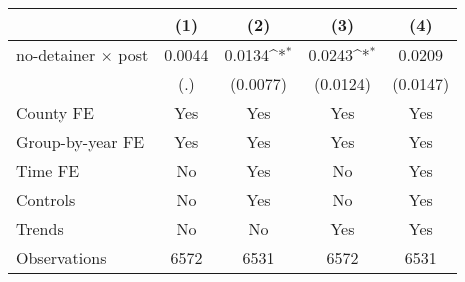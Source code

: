 {
\def\sym#1{\ifmmode^{#1}\else\(^{#1}\)\fi}
\begin{tabular*}{0.7\textwidth}{@{\hskip\tabcolsep\extracolsep\fill}l*{4}{c}}
\hline\hline
                    &\multicolumn{1}{c}{(1)}         &\multicolumn{1}{c}{(2)}         &\multicolumn{1}{c}{(3)}         &\multicolumn{1}{c}{(4)}         \\
\hline
no-detainer $\times$ post&      0.0044         &      0.0134\sym{*}  &      0.0243\sym{*}  &      0.0209         \\
                    &         (.)         &    (0.0077)         &    (0.0124)         &    (0.0147)         \\
[1em]
County FE           &         Yes         &         Yes         &         Yes         &         Yes         \\
[1em]
Group-by-year FE    &         Yes         &         Yes         &         Yes         &         Yes         \\
[1em]
Time FE             &          No         &         Yes         &          No         &         Yes         \\
[1em]
Controls            &          No         &         Yes         &          No         &         Yes         \\
[1em]
Trends              &          No         &          No         &         Yes         &         Yes         \\
\hline
Observations        &        6572         &        6531         &        6572         &        6531         \\
\hline\hline
\end{tabular*}
}
